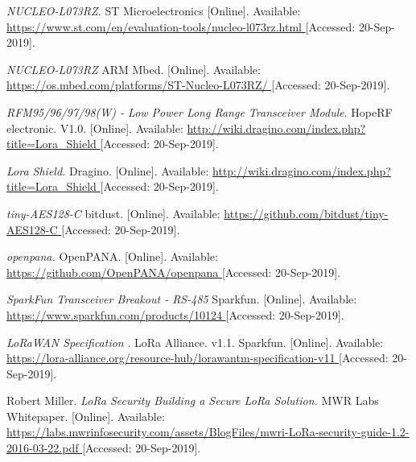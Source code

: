

\begin{thebibliography}{9}



\textit{
NUCLEO-L073RZ.
}
ST Microelectronics
[Online]. Available:
\url{
https://www.st.com/en/evaluation-tools/nucleo-l073rz.html
}
[Accessed: 20-Sep-2019].


\textit{
NUCLEO-L073RZ
}
ARM Mbed.
[Online]. Available:
\url{
https://os.mbed.com/platforms/ST-Nucleo-L073RZ/
}
[Accessed: 20-Sep-2019].


\textit{
RFM95/96/97/98(W) - Low Power Long Range Transceiver Module}.
HopeRF electronic.
V1.0.
[Online]. Available:
\url{
http://wiki.dragino.com/index.php?title=Lora_Shield
}
[Accessed: 20-Sep-2019].



\textit{
Lora Shield.
}
Dragino.
[Online]. Available:
\url{
http://wiki.dragino.com/index.php?title=Lora_Shield
}
[Accessed: 20-Sep-2019].



\textit{
tiny-AES128-C
}
bitdust.
[Online]. Available:
\url{
https://github.com/bitdust/tiny-AES128-C
}
[Accessed: 20-Sep-2019].



\textit{
openpana.
}
OpenPANA.
[Online]. Available:
\url{
https://github.com/OpenPANA/openpana
}
[Accessed: 20-Sep-2019].



\textit{
SparkFun Transceiver Breakout - RS-485
}
Sparkfun.
[Online]. Available:
\url{
https://www.sparkfun.com/products/10124
}
[Accessed: 20-Sep-2019].




\textit{
LoRaWAN Specification
}.
LoRa Alliance.
v1.1.
Sparkfun.
[Online]. Available:
\url{
https://lora-alliance.org/resource-hub/lorawantm-specification-v11
}
[Accessed: 20-Sep-2019].




Robert Miller.
\textit{
LoRa Security
Building a Secure LoRa Solution.
}
MWR Labs Whitepaper.
[Online]. Available:
\url{
https://labs.mwrinfosecurity.com/assets/BlogFiles/mwri-LoRa-security-guide-1.2-2016-03-22.pdf
}
[Accessed: 20-Sep-2019].





\end{thebibliography}
